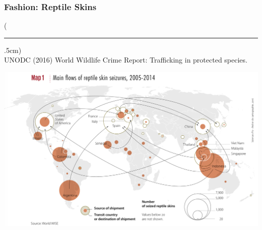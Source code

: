 \documentclass[10pt]{beamer}
\newenvironment{reference}[2]{%
	\begin{textblock*}{\textwidth}(#1,#2)
		\tiny\bgroup\color{gray}}{\egroup\end{textblock*}}
\begin{document}
\begin{frame}[t]
\frametitle{Fashion: Reptile Skins}
\vspace{0.25cm}

	\begin{reference}{4mm}{92mm}
		\rule{1.5cm}{0.25pt}\\
		UNODC (2016) World Wildlife Crime Report: Trafficking in protected species.
	\end{reference}
	
	\begin{center}
		\includegraphics[width=1.0\textwidth]{figures/map3.png}
	\end{center}
\end{frame}
\end{document}
